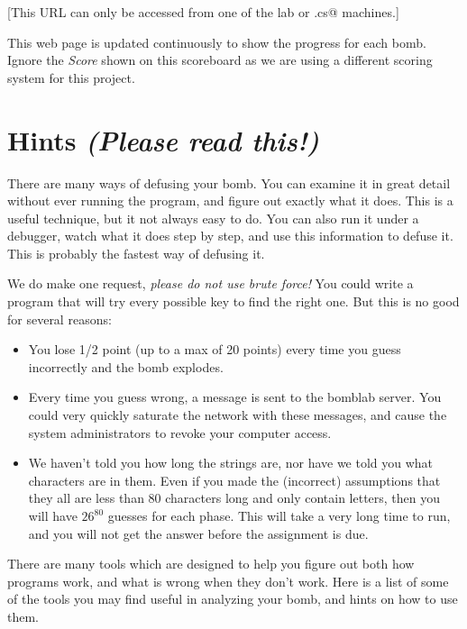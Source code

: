 \documentclass[11pt]{article}
\begin{document}
[This URL can only be accessed from one of the lab or \verb@remote.cs@
  machines.]

This web page is updated continuously to show the progress for
each bomb.  Ignore the {\em Score} shown on this scoreboard as
we are using a different scoring system for this project.


\section*{Hints {\em (Please read this!)}}

There are many ways of defusing your bomb.  You can examine it in
great detail without ever running the program, and figure out exactly
what it does.  This is a useful technique, but it not always easy to
do.  You can also run it under a debugger, watch what it does step
by step, and use this information to defuse it.  This is probably the
fastest way of defusing it.

We do make one request, {\em please do not use brute force!}  You could
write a program that will try every possible key to find the right
one.  But this is no good for several reasons:
\begin{itemize}
\item You lose 1/2 point (up to a max of 20 points) 
every time you guess incorrectly and the bomb explodes.  

\item Every time you guess wrong, a message is sent to the bomblab server.  
You could very quickly saturate the network with these messages, and cause
the system administrators to revoke your computer access.

\item We haven't told you how long the strings are, nor have we told you
what characters are in them.  Even if you made the (incorrect) assumptions
that they all are less than 80 characters long and only contain
letters, then you will have $26^{80}$ guesses for each phase.  This will
take a very long time to run, and you will not get the answer before
the assignment is due.
\end{itemize}

There are many tools which are designed to help you figure out both
how programs work, and what is wrong when they don't work.  Here is a
list of some of the tools you may find useful in analyzing your bomb,
and hints on how to use them.
\end{document}
